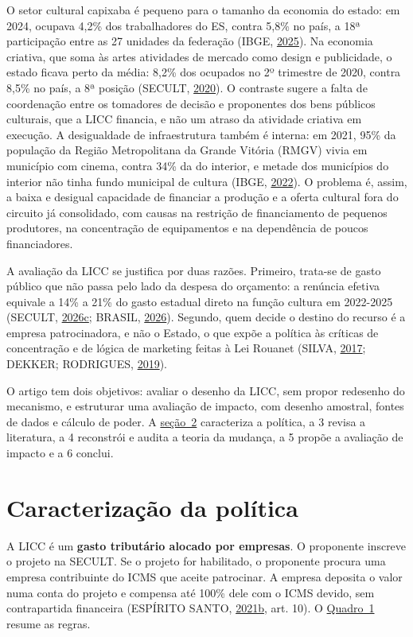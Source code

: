 \documentclass[12pt,a4paper]{article}
\begin{document}
O setor cultural capixaba é pequeno para o tamanho da economia do estado: em 2024, ocupava 4,2\% dos
trabalhadores do ES, contra 5,8\% no país, a 18ª participação entre as 27 unidades da federação
(IBGE, \hyperref[ref-ibge-22]{2025}). Na economia criativa, que soma às artes atividades de mercado
como design e publicidade, o estado ficava perto da média: 8,2\% dos ocupados no 2º trimestre de
2020, contra 8,5\% no país, a 8ª posição (SECULT, \hyperref[ref-secult-29]{2020}). O contraste
sugere a falta de coordenação entre os tomadores de decisão e proponentes dos bens públicos
culturais, que a LICC financia, e não um atraso da atividade criativa em execução. A desigualdade de
infraestrutura também é interna: em 2021, 95\% da população da Região Metropolitana da Grande
Vitória (RMGV) vivia em município com cinema, contra 34\% da do interior, e metade dos municípios do
interior não tinha fundo municipal de cultura (IBGE, \hyperref[ref-ibge-23]{2022}). O problema é,
assim, a baixa e desigual capacidade de financiar a produção e a oferta cultural fora do circuito já
consolidado, com causas na restrição de financiamento de pequenos produtores, na concentração de
equipamentos e na dependência de poucos financiadores.

A avaliação da LICC se justifica por duas razões. Primeiro, trata-se de gasto público que não passa
pelo lado da despesa do orçamento: a renúncia efetiva equivale a 14\% a 21\% do gasto estadual
direto na função cultura em 2022-2025 (SECULT, \hyperref[ref-secult-39]{2026c}; BRASIL,
\hyperref[ref-brasil-6]{2026}). Segundo, quem decide o destino do recurso é a empresa patrocinadora,
e não o Estado, o que expõe a política às críticas de concentração e de lógica de marketing feitas à
Lei Rouanet (SILVA, \hyperref[ref-silva-45]{2017}; DEKKER; RODRIGUES,
\hyperref[ref-dekker-9]{2019}).

O artigo tem dois objetivos: avaliar o desenho da LICC, sem propor redesenho do mecanismo, e
estruturar uma avaliação de impacto, com desenho amostral, fontes de dados e cálculo de poder. A
\hyperref[secao-2]{seção~2} caracteriza a política, a 3 revisa a literatura, a 4 reconstrói e audita a teoria da
mudança, a 5 propõe a avaliação de impacto e a 6 conclui.

\section{Caracterização da política}\label{secao-2}

A LICC é um \textbf{gasto tributário alocado por empresas}. O proponente inscreve o projeto na
SECULT. Se o projeto for habilitado, o proponente procura uma empresa contribuinte do ICMS que
aceite patrocinar. A empresa deposita o valor numa conta do projeto e compensa até 100\% dele com o
ICMS devido, sem contrapartida financeira (ESPÍRITO SANTO, \hyperref[ref-espirito-13]{2021b}, art.
10). O \hyperref[quadro-1]{Quadro~1} resume as regras.
\end{document}
